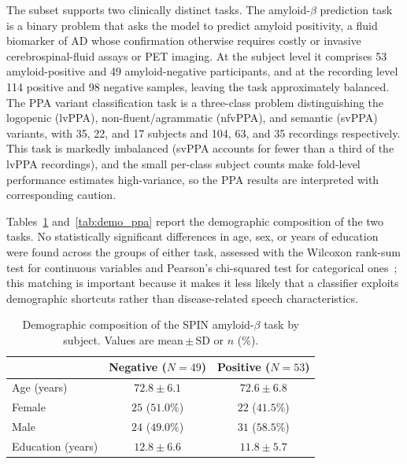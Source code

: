 \documentclass[a4paper,12pt]{article}
\begin{document}
The subset supports two clinically distinct tasks. The amyloid-$\beta$ prediction task is a binary problem that asks the model to predict amyloid positivity, a fluid biomarker of AD whose confirmation otherwise requires costly or invasive cerebrospinal-fluid assays or PET imaging. At the subject level it comprises 53 amyloid-positive and 49 amyloid-negative participants, and at the recording level 114 positive and 98 negative samples, leaving the task approximately balanced. The PPA variant classification task is a three-class problem distinguishing the logopenic (lvPPA), non-fluent/agrammatic (nfvPPA), and semantic (svPPA) variants, with 35, 22, and 17 subjects and 104, 63, and 35 recordings respectively. This task is markedly imbalanced (svPPA accounts for fewer than a third of the lvPPA recordings), and the small per-class subject counts make fold-level performance estimates high-variance, so the PPA results are interpreted with corresponding caution.

Tables~\ref{tab:demo_amyloid} and~\ref{tab:demo_ppa} report the demographic composition of the two tasks. No statistically significant differences in age, sex, or years of education were found across the groups of either task, assessed with the Wilcoxon rank-sum test for continuous variables and Pearson's chi-squared test for categorical ones~\cite{esteve2025speechadppa}; this matching is important because it makes it less likely that a classifier exploits demographic shortcuts rather than disease-related speech characteristics.

\begin{table}[H]
\centering
\caption[SPIN demographics by amyloid status]{\footnotesize Demographic composition of the SPIN amyloid-$\beta$ task by subject. Values are mean\,$\pm$\,SD or $n$ (\%).}
\label{tab:demo_amyloid}
\footnotesize{
\begin{tabular}{@{}lcc@{}}
\toprule
 & \textbf{Negative} ($N=49$) & \textbf{Positive} ($N=53$) \\ \midrule
Age (years)      & $72.8\pm6.1$ & $72.6\pm6.8$ \\
Female           & $25$ ($51.0\%$) & $22$ ($41.5\%$) \\
Male             & $24$ ($49.0\%$) & $31$ ($58.5\%$) \\
Education (years)& $12.8\pm6.6$ & $11.8\pm5.7$ \\
\bottomrule
\end{tabular}
}
\end{table}
\end{document}
